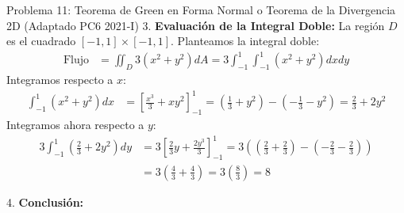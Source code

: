 \documentclass[11pt,a4paper]{article}
\begin{document}
\begin{ejerciciobox}{Problema 11: Teorema de Green en Forma Normal o Teorema de la Divergencia 2D (Adaptado PC6 2021-I)}
3. \textbf{Evaluación de la Integral Doble:}
La región $D$ es el cuadrado $[-1, 1] \times [-1, 1]$.
Planteamos la integral doble:
\begin{align*}
\text{Flujo} &= \iint_D 3(x^2 + y^2) dA = 3 \int_{-1}^1 \int_{-1}^1 (x^2 + y^2) dx dy
\end{align*}
Integramos respecto a $x$:
\begin{align*}
\int_{-1}^1 (x^2 + y^2) dx &= \left[ \frac{x^3}{3} + x y^2 \right]_{-1}^1 = \left( \frac{1}{3} + y^2 \right) - \left( -\frac{1}{3} - y^2 \right) = \frac{2}{3} + 2y^2
\end{align*}
Integramos ahora respecto a $y$:
\begin{align*}
3 \int_{-1}^1 \left( \frac{2}{3} + 2y^2 \right) dy &= 3 \left[ \frac{2}{3}y + \frac{2y^3}{3} \right]_{-1}^1 = 3 \left( \left( \frac{2}{3} + \frac{2}{3} \right) - \left( -\frac{2}{3} - \frac{2}{3} \right) \right) \\
&= 3 \left( \frac{4}{3} + \frac{4}{3} \right) = 3 \left( \frac{8}{3} \right) = 8
\end{align*}

4. \textbf{Conclusión:}
\end{ejerciciobox}
\end{document}
